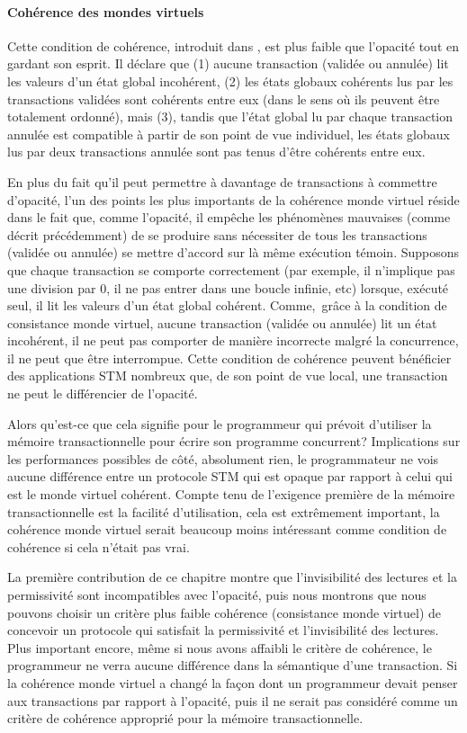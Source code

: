 \paragraph{Cohérence des mondes virtuels}
Cette condition de cohérence, introduit dans \cite{IR09}, est plus faible que l'opacité tout en gardant son esprit.
Il déclare que (1) aucune transaction (validée ou annulée) lit les valeurs d'un état global incohérent,
(2) les états globaux cohérents lus par les transactions validées sont cohérents entre eux (dans le sens où ils peuvent être totalement ordonné),
mais (3), tandis que l'état global lu par chaque transaction annulée est compatible à partir de son point de vue individuel,
les états globaux lus par deux transactions annulée sont pas tenus d'être cohérents entre eux.

En plus du fait qu'il peut permettre à davantage de transactions à commettre d'opacité,
l'un des points les plus importants de la cohérence monde virtuel réside dans le fait que, comme l'opacité,
il empêche les phénomènes mauvaises (comme décrit précédemment) de se produire sans nécessiter de tous les transactions
(validée ou annulée) se mettre d'accord sur là même exécution témoin.
Supposons que chaque transaction se comporte correctement (par exemple, il n'implique pas une division par 0,
il ne pas entrer dans une boucle infinie, etc) lorsque, exécuté seul, il lit les valeurs d'un état global cohérent.
Comme, grâce à la condition de consistance monde virtuel, aucune transaction (validée ou annulée) lit un état incohérent,
il ne peut pas comporter de manière incorrecte malgré la concurrence, il ne peut que être interrompue.
Cette condition de cohérence peuvent bénéficier des applications STM nombreux que, de son point de vue local,
une transaction ne peut le différencier de l'opacité.




Alors qu'est-ce que cela signifie pour le programmeur qui prévoit d'utiliser la mémoire transactionnelle pour écrire son programme concurrent?
Implications sur les performances possibles de côté, absolument rien, le programmateur
ne vois aucune différence entre un protocole STM qui est opaque par rapport à celui qui est le monde virtuel cohérent.
Compte tenu de l'exigence première de la mémoire transactionnelle est la facilité d'utilisation, cela est extrêmement important,
la cohérence monde virtuel serait beaucoup moins intéressant comme condition de cohérence si cela n'était pas vrai.

La première contribution de ce chapitre montre que l'invisibilité des lectures et la permissivité sont incompatibles avec l'opacité,
puis nous montrons que nous pouvons choisir un critère plus faible cohérence (consistance monde virtuel) de concevoir un protocole qui satisfait la permissivité et l'invisibilité des lectures.
Plus important encore, même si nous avons affaibli le critère de cohérence, le programmeur ne verra aucune différence dans la sémantique d'une transaction.
Si la cohérence monde virtuel a changé la façon dont un programmeur devait penser aux transactions par rapport à l'opacité,
puis il ne serait pas considéré comme un critère de cohérence approprié pour la mémoire transactionnelle.


